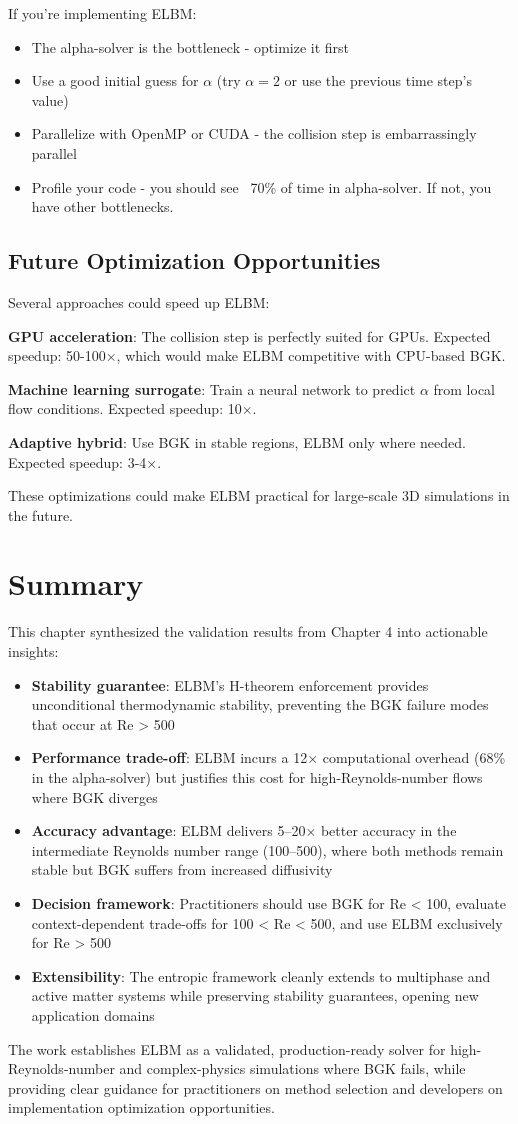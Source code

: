 If you're implementing ELBM:
\begin{itemize}
    \item The alpha-solver is the bottleneck - optimize it first
    \item Use a good initial guess for $\alpha$ (try $\alpha = 2$ or use the previous time step's value)
    \item Parallelize with OpenMP or CUDA - the collision step is embarrassingly parallel
    \item Profile your code - you should see ~70\% of time in alpha-solver. If not, you have other bottlenecks.
\end{itemize}

\subsection{Future Optimization Opportunities}

Several approaches could speed up ELBM:

\textbf{GPU acceleration}: The collision step is perfectly suited for GPUs. Expected speedup: 50-100×, which would make ELBM competitive with CPU-based BGK.

\textbf{Machine learning surrogate}: Train a neural network to predict $\alpha$ from local flow conditions. Expected speedup: 10×.

\textbf{Adaptive hybrid}: Use BGK in stable regions, ELBM only where needed. Expected speedup: 3-4×.

These optimizations could make ELBM practical for large-scale 3D simulations in the future.

\section{Summary}

This chapter synthesized the validation results from Chapter 4 into actionable insights:

\begin{itemize}
    \item \textbf{Stability guarantee}: ELBM's H-theorem enforcement provides unconditional thermodynamic stability, preventing the BGK failure modes that occur at Re > 500
    \item \textbf{Performance trade-off}: ELBM incurs a 12× computational overhead (68\% in the alpha-solver) but justifies this cost for high-Reynolds-number flows where BGK diverges
    \item \textbf{Accuracy advantage}: ELBM delivers 5–20× better accuracy in the intermediate Reynolds number range (100–500), where both methods remain stable but BGK suffers from increased diffusivity
    \item \textbf{Decision framework}: Practitioners should use BGK for Re < 100, evaluate context-dependent trade-offs for 100 < Re < 500, and use ELBM exclusively for Re > 500
    \item \textbf{Extensibility}: The entropic framework cleanly extends to multiphase and active matter systems while preserving stability guarantees, opening new application domains
\end{itemize}

The work establishes ELBM as a validated, production-ready solver for high-Reynolds-number and complex-physics simulations where BGK fails, while providing clear guidance for practitioners on method selection and developers on implementation optimization opportunities.

